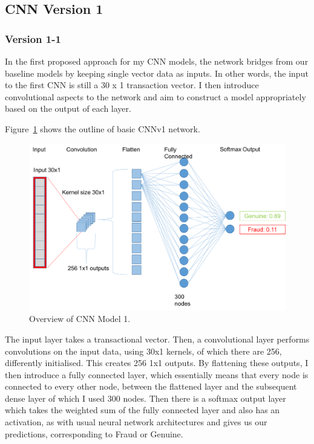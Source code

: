 \documentclass[12pt,a4paper,twoside]{report}
\begin{document}
\subsection{CNN Version 1}

\subsubsection{Version 1-1}
In the first proposed approach for my CNN models, the network bridges from our baseline models by keeping single vector data as inputs. In other words, the input to the first CNN is still a 30 x 1 transaction vector. I then introduce convolutional aspects to the network and aim to construct a model appropriately based on the output of each layer. 

Figure~\ref{fig:cnnv1} shows the outline of basic CNNv1 network.

\begin{figure}[H]
\centering
\includegraphics[scale=0.6]{cnnv1}
\caption{Overview of CNN Model 1.}
\label{fig:cnnv1}
\end{figure}

The input layer takes a transactional vector. Then, a convolutional layer performs convolutions on the input data, using 30x1 kernels, of which there are 256, differently initialised. This creates 256 1x1 outputs. By flattening these outputs, I then introduce a fully connected layer, which essentially means that every node is connected to every other node, between the flattened layer and the subsequent dense layer of which I used 300 nodes. Then there is a softmax output layer which takes the weighted sum of the fully connected layer and also has an activation, as with usual neural network architectures and gives us our predictions, corresponding to Fraud or Genuine.
\end{document}
